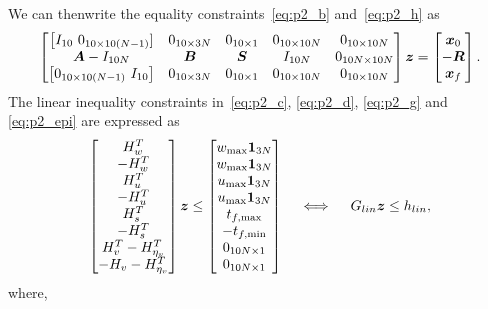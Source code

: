 \documentclass[10pt]{article}
\begin{document}
We can thenwrite the equality constraints~\eqref{eq:p2_b} and~\eqref{eq:p2_h} as
\begin{equation}
\begin{bmatrix}
\big[ I_{10} \ 0_{10 \times 10(N-1)}] & 0_{10 \times 3N} & 0_{10 \times 1} & 0_{10 \times 10N} & 0_{10 \times 10N} \\
\bm{A} - I_{10N} & \bm{B} & \bm{S} & I_{10N} & 0_{10N \times 10N} \\
\big[ 0_{10 \times 10(N-1)} \ I_{10} \big] & 0_{10 \times 3N} & 0_{10 \times 1} & 0_{10 \times 10N} & 0_{10 \times 10N}
\end{bmatrix} \bm{z} = \begin{bmatrix}
\bm{x}_0 \\ -\bm{R} \\ \bm{x}_f
\end{bmatrix}.
\label{eq:std_equality}
\end{equation}
The linear inequality constraints in~\eqref{eq:p2_c}, \eqref{eq:p2_d}, \eqref{eq:p2_g} and \eqref{eq:p2_epi} are expressed as
\begin{equation}
\begin{bmatrix}
H_w^T \\ - H_w^T \\ H_u^T \\ - H_u^T \\ H_s^T \\ - H_s^T \\ H_v^T - H_{\eta_v}^T \\ -H_v - H_{\eta_v}^T
\end{bmatrix} \bm{z} \leq \begin{bmatrix}
w_{\max} \bm{1}_{3N} \\ w_{\max} \bm{1}_{3N} \\ u_{\max} \bm{1}_{3N} \\ u_{\max} \bm{1}_{3N} \\ t_{f,\max} \\ -t_{f,\min} \\ 0_{10N \times 1} \\ 0_{10N \times 1}
\end{bmatrix} \quad \iff \quad G_{lin} \bm{z} \leq h_{lin},
\label{eq:std_ineq_lin}
\end{equation}
where,
\end{document}
